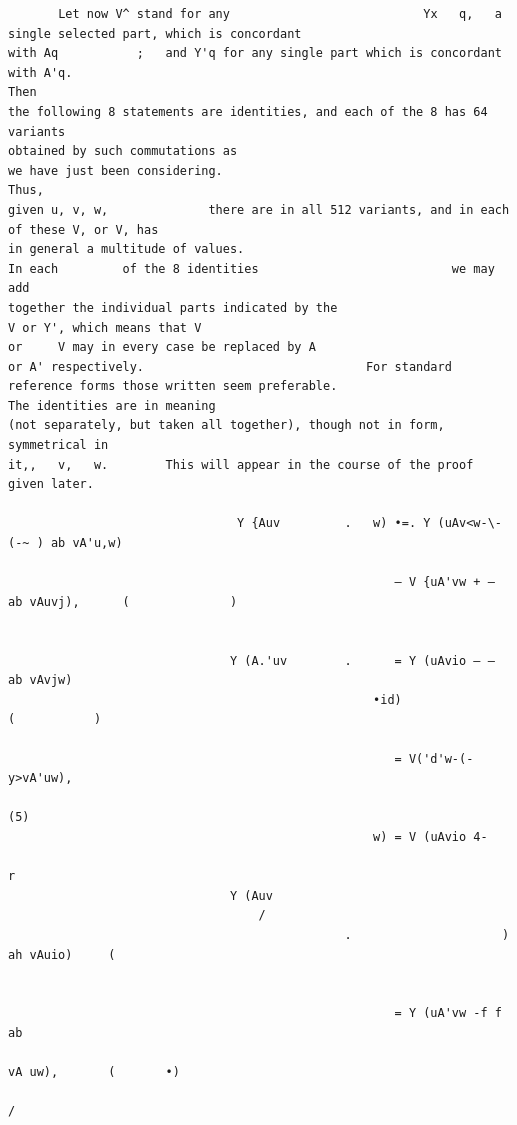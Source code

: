 \documentclass[10pt]{article}
\begin{document}
\begin{verbatim}
       Let now V^ stand for any                           Yx   q,   a single selected part, which is concordant
with Aq           ;   and Y'q for any single part which is concordant with A'q.                                                                Then
the following 8 statements are identities, and each of the 8 has 64 variants
obtained by such commutations as                                        we have just been considering.                                         Thus,
given u, v, w,              there are in all 512 variants, and in each of these V, or V, has
in general a multitude of values.                                       In each         of the 8 identities                           we may add
together the individual parts indicated by the                                                  V or Y', which means that V
or     V may in every case be replaced by A                                         or A' respectively.                               For standard
reference forms those written seem preferable.                                                  The identities are in meaning
(not separately, but taken all together), though not in form, symmetrical in
it,,   v,   w.        This will appear in the course of the proof given later.

                                Y {Auv         .   w) •=. Y (uAv<w-\-(-~ ) ab vA'u,w)

                                                      — V {uA'vw + — ab vAuvj),      (              )


                               Y (A.'uv        .      = Y (uAvio — — ab vAvjw)
                                                   •id)                             (           )

                                                      = V('d'w-(- y>vA'uw),
                                                                                                                                                    (5)
                                                   w) = V (uAvio 4-
                                                                                  r
                               Y (Auv
                                   /
                                               .                     ) ah vAuio)     (


                                                      = Y (uA'vw -f f  ab
                                                                          vA uw),       (       •)
                                                                                                              /





\end{verbatim}
\end{document}
